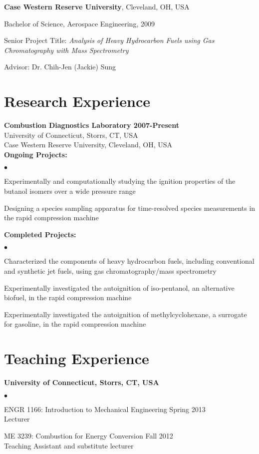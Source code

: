 \documentclass[margin,line]{res}
\newenvironment{list1}{
  \begin{list}{\ding{113}}{%
      \setlength{\itemsep}{0in}
      \setlength{\parsep}{0in} \setlength{\parskip}{0in}
      \setlength{\topsep}{0in} \setlength{\partopsep}{0in} 
      \setlength{\leftmargin}{0.17in}}}{\end{list}}
\newenvironment{list2}{
  \begin{list}{$\bullet$}{%
      \setlength{\itemsep}{0.05in}
      \setlength{\parsep}{0in} \setlength{\parskip}{0in}
      \setlength{\topsep}{0in} \setlength{\partopsep}{0in} 
      \setlength{\leftmargin}{0.2in}}}{\end{list}}
\begin{document}
\begin{resume}
{\bf Case Western Reserve University}, Cleveland, OH, USA
\begin{list1}
\item[] Bachelor of Science, Aerospace Engineering, 2009
\item[] Senior Project Title: \emph{Analysis of Heavy Hydrocarbon Fuels using Gas Chromatography with Mass Spectrometry}
\item[] Advisor: Dr. Chih-Jen (Jackie) Sung
\end{list1}

\section{\sc Research Experience}
{\bf \large{Combustion Diagnostics Laboratory \hfill 2007-Present}}\\
University of Connecticut, Storrs, CT, USA\\
Case Western Reserve University, Cleveland, OH, USA\\
{\bf Ongoing Projects:}
\begin{list2}
\item Experimentally and computationally studying the ignition properties of the butanol isomers over a wide pressure range
\item Designing a species sampling apparatus for time-resolved species measurements in the rapid compression machine
\end{list2}
{\bf Completed Projects:}
\begin{list2}
\item Characterized the components of heavy hydrocarbon fuels, including conventional and synthetic jet fuels, using gas chromatography/mass spectrometry
\item Experimentally investigated the autoignition of iso-pentanol, an alternative biofuel, in the rapid compression machine
\item Experimentally investigated the autoignition of methylcyclohexane, a surrogate for gasoline, in the rapid compression machine
\end{list2}

\section{\sc Teaching Experience}
{\bf \large{University of Connecticut, Storrs, CT, USA}}\\
\begin{list2}
\item ENGR 1166: Introduction to Mechanical Engineering \hfill Spring 2013\\
Lecturer
\item ME 3239: Combustion for Energy Conversion \hfill Fall 2012\\
Teaching Assistant and substitute lecturer
\end{list2}


\end{resume}
\end{document}
